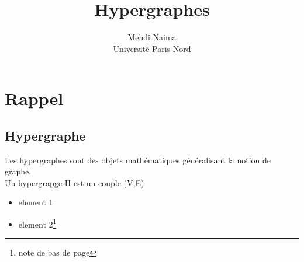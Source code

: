 \documentclass[a4paper,11pt]{article}
\author{Mehdi Naima\\ Université Paris Nord}
\title{Hypergraphes}
\begin{document}
\begin{abstract}

\end{abstract}
\maketitle








\newpage

\tableofcontents


\pagestyle{fancy}
\renewcommand\headrulewidth{0.5pt}
\newpage
\listoffigures
\listoftables
\newpage

 


\section{Rappel}

\subsection{Hypergraphe}
Les hypergraphes sont des objets mathématiques généralisant la notion de graphe. \\
Un hypergrapge H est un couple (V,E)

\begin{itemize}
\item
element 1
\item
element 2\footnote{note de bas de page}
\end{itemize}
\end{document}
